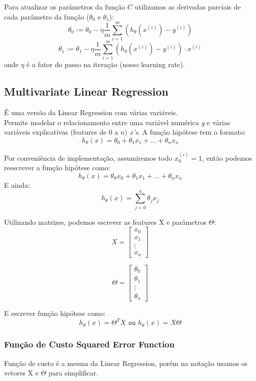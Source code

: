 \documentclass[11pt,a4paper,leqno]{article}
\begin{document}
Para atualizar os parâmetros da função $C$ utilizamos as derivadas parciais de cada parâmetro da função ($\theta_0$ e $\theta_1$):
\[
\theta_0 := \theta_0 - \eta \frac{1}{m} \sum\limits_{i=1}^{m} (h_\theta(x^{(i)}) - y^{(i)})
\] \[
\theta_1 := \theta_1 - \eta \frac{1}{m} \sum\limits_{i=1}^{m} (h_\theta(x^{(i)}) - y^{(i)}) \cdot x^{(i)}
\]
onde $\eta$ é a fator do passo na iteração (nosso learning rate).




\subsection{Multivariate Linear Regression}
É uma versão da Linear Regression com várias variáveis.\\
Permite modelar o relacionamento entre uma variável numérica \emph{y} e várias variáveis explicativas (features de 0 a $n$) \emph{x's}.
A função hipótese tem o formato:
\[ h_\theta(x) = \theta_0 + \theta_1 x_1 + ... + \theta_n x_n \]

Por conveniência de implementação, assumiremos todo $x_0^{(i)} = 1$, então podemos reescrever a função hipótese como:
\[ h_\theta(x) = \theta_0 x_0 + \theta_1 x_1 + ... + \theta_n x_n \]
E ainda:
\[ h_\theta(x) = \sum_{j=0}^n \theta_j x_j \]

Utilizando matrizes, podemos escrever as features X e parâmetros $\Theta$:
\[
X = \begin{bmatrix}
	x_{0} \\
	x_{1} \\
	\vdots \\
	x_{n}
 \end{bmatrix}
\]
 
\[
\Theta = \begin{bmatrix}
	\theta_{0} \\
	\theta_{1} \\
	\vdots \\
	\theta_{n}
 \end{bmatrix}
\]

E escrever função hipótese como:
\[ h_\theta(x) = \Theta^T X \texttt{ ou } h_\theta(x) = X \Theta \]



\subsubsection{Função de Custo Squared Error Function}
Função de custo é a mesma da Linear Regression, porém na notação usamos os vetores X e $\Theta$ para simplificar.
\end{document}
